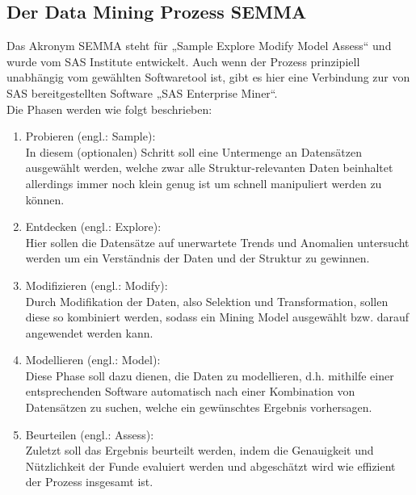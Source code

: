 \subsection{Der Data Mining Prozess SEMMA}
\label{sec:process:alt:semma}

Das Akronym SEMMA steht für „Sample Explore Modify Model Assess“ und wurde vom
SAS Institute entwickelt. Auch wenn der Prozess prinzipiell unabhängig vom
gewählten Softwaretool ist, gibt es hier eine Verbindung zur von SAS
bereitgestellten Software „SAS Enterprise Miner“. \\
Die Phasen werden wie folgt beschrieben:
\begin{enumerate}
  \item Probieren (engl.: Sample):  \\
  In diesem (optionalen) Schritt soll eine Untermenge an Datensätzen ausgewählt
  werden, welche zwar alle Struktur-relevanten Daten beinhaltet allerdings immer
  noch klein genug ist um schnell manipuliert werden zu können.
  \item Entdecken (engl.: Explore): \\
  Hier sollen die Datensätze auf unerwartete Trends und Anomalien untersucht
  werden um ein Verständnis der Daten und der Struktur zu gewinnen.
  \item Modifizieren (engl.: Modify):  \\
  Durch Modifikation der Daten, also Selektion und Transformation, sollen diese
  so kombiniert werden, sodass ein Mining Model ausgewählt bzw. darauf
  angewendet werden kann.
  \item Modellieren (engl.: Model):  \\
  Diese Phase soll dazu dienen, die Daten zu modellieren, d.h. mithilfe einer
  entsprechenden Software automatisch nach einer Kombination von Datensätzen zu
  suchen, welche ein gewünschtes Ergebnis vorhersagen.
  \item Beurteilen (engl.: Assess):  \\
  Zuletzt soll das Ergebnis beurteilt werden, indem die Genauigkeit und
  Nützlichkeit der Funde evaluiert werden und abgeschätzt wird wie effizient der
  Prozess insgesamt ist.
\end{enumerate}
